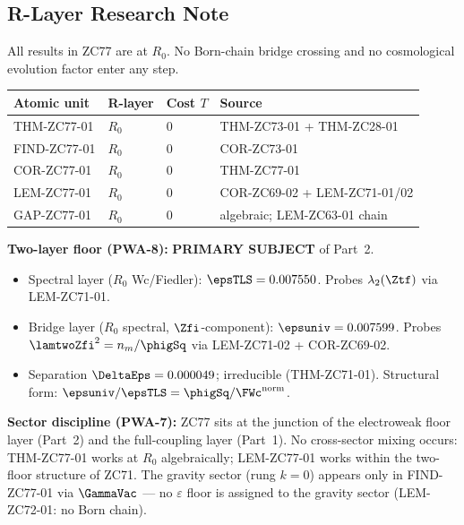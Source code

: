 \documentclass[12pt, a4paper]{article}
\begin{document}
\subsection{R-Layer Research Note}
\label{sec:rlayer}

\begin{layerbox}[title={R-Layer Assignments for ZC77}]

All results in ZC77 are at $R_0$. No Born-chain bridge crossing
and no cosmological evolution factor enter any step.

{\small\renewcommand{\arraystretch}{1.25}
\begin{center}
\begin{tabular}{@{}llll@{}}
\toprule
Atomic unit & R-layer & Cost $T$ & Source \\
\midrule
THM-ZC77-01  & $R_0$ & $0$ & THM-ZC73-01 + THM-ZC28-01 \\
FIND-ZC77-01 & $R_0$ & $0$ & COR-ZC73-01 \\
COR-ZC77-01  & $R_0$ & $0$ & THM-ZC77-01 \\
LEM-ZC77-01  & $R_0$ & $0$ & COR-ZC69-02 + LEM-ZC71-01/02 \\
GAP-ZC77-01  & $R_0$ & $0$ & algebraic; LEM-ZC63-01 chain \\
\bottomrule
\end{tabular}
\end{center}}

\textbf{Two-layer floor (PWA-8):} \textbf{PRIMARY SUBJECT} of Part~2.
\begin{itemize}[leftmargin=2em, noitemsep]
  \item Spectral layer ($R_0$ Wc/Fiedler): $\epsTLS = 0.007550$.
    Probes $\lambda_2(\Ztf)$ via LEM-ZC71-01.
  \item Bridge layer ($R_0$ spectral, $\Zfi$-component):
    $\epsuniv = 0.007599$. Probes $\lamtwoZfi^2 = n_m/\phigSq$
    via LEM-ZC71-02 + COR-ZC69-02.
  \item Separation $\DeltaEps = 0.000049$; irreducible (THM-ZC71-01).
    Structural form: $\epsuniv/\epsTLS = \phigSq/\FWc^{\rm norm}$.
\end{itemize}

\textbf{Sector discipline (PWA-7):} ZC77 sits at the junction of
the electroweak floor layer (Part~2) and the full-coupling
layer (Part~1). No cross-sector mixing occurs: THM-ZC77-01 works
at $R_0$ algebraically; LEM-ZC77-01 works within the two-floor
structure of ZC71. The gravity sector (rung $k=0$) appears only in
FIND-ZC77-01 via $\GammaVac$ --- no $\varepsilon$ floor is assigned
to the gravity sector (LEM-ZC72-01: no Born chain).
\end{layerbox}
\end{document}
